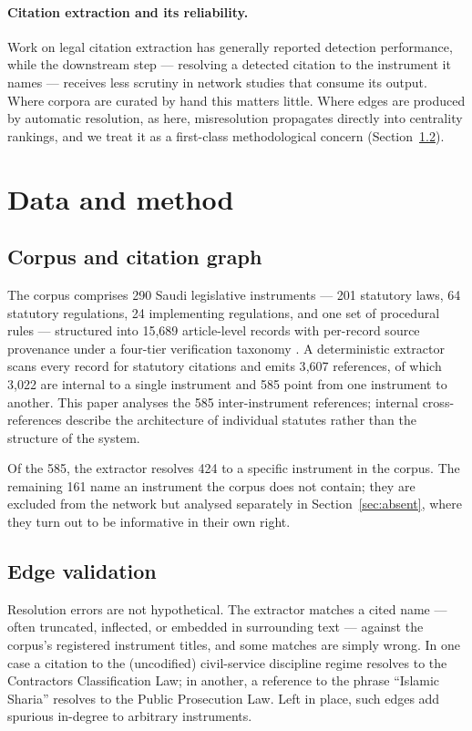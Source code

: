 \documentclass[sn-basic]{sn-jnl}%
\begin{document}
\paragraph{Citation extraction and its reliability.}
Work on legal citation extraction has generally reported detection
performance, while the downstream step --- resolving a detected citation to
the instrument it names --- receives less scrutiny in network studies that
consume its output. Where corpora are curated by hand this matters little.
Where edges are produced by automatic resolution, as here, misresolution
propagates directly into centrality rankings, and we treat it as a first-class
methodological concern (Section~\ref{sec:validation}).

\section{Data and method}
\label{sec:method}

\subsection{Corpus and citation graph}

The corpus comprises 290 Saudi legislative instruments --- 201 statutory
laws, 64 statutory regulations, 24 implementing regulations, and one set of
procedural rules --- structured into 15{,}689 article-level records with
per-record source provenance under a four-tier verification taxonomy
\citep{almohammedi2026corpus}. A deterministic extractor scans every record
for statutory citations and emits 3{,}607 references, of which 3{,}022 are
internal to a single instrument and 585 point from one instrument to
another. This paper analyses the 585 inter-instrument references; internal
cross-references describe the architecture of individual statutes rather
than the structure of the system.

Of the 585, the extractor resolves 424 to a specific instrument in the
corpus. The remaining 161 name an instrument the corpus does not contain;
they are excluded from the network but analysed separately in
Section~\ref{sec:absent}, where they turn out to be informative in their own
right.

\subsection{Edge validation}
\label{sec:validation}

Resolution errors are not hypothetical. The extractor matches a cited name
--- often truncated, inflected, or embedded in surrounding text --- against
the corpus's registered instrument titles, and some matches are simply
wrong. In one case a citation to the (uncodified) civil-service discipline
regime resolves to the Contractors Classification Law; in another, a
reference to the phrase ``Islamic Sharia'' resolves to the Public
Prosecution Law. Left in place, such edges add spurious in-degree to
arbitrary instruments.
\end{document}
